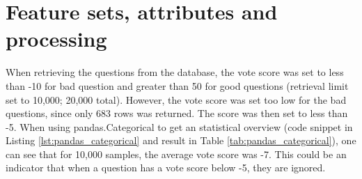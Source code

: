 \begin{comment}
		11. Stemming of data, model creation and gridsearch with SGD			
		12. Model based on 20,000 samples (10k good, 10k bad) - took approx ~3hours for both models
			Model 1 was for all data (no test set). Model 2 was based on train\_test\_split
		13. Added tags column to the used dataset. Added the unprocessed dataset (but html is removed)
		14. Tested out different SVM algorithms (SVC, SGD and LinearSVC)
			Issue was that I managed to overwrite the .csv, so I had to do everything over again
			took approximately 24-36 hours to complete (+ 3days before hand to make everything run smoothly).
		15. Attempted to use optparse, argparse to make it executable. 
			Problem is that it exits after command is run. Need it to continue running to be able to:
				a) create new (or load existing) model
				b) use model from a) to predict quality of entered question (rinse/repeat)
		16. Used while loop instead (loop until exit entered). shortcuts are the same as with argparse, but 
			without the '-' in front (e.g. instead of -e, just press 'e' to exit)
			
		Additional Notes (which might be relevant for the next section):
		
			- issues with setting up environment, installations, etc
			- switching from "good"/"bad" to +/-1 for class label (bcz libsvm)
			- switching from -10/+50 to -5/+50 to get more separation (and more results for bad)
			
		Potentially useful links:
		
		http://billchambers.me/tutorials/2015/01/14/python-nlp-cheatsheet-nltk-scikit-learn.html
		http://stackoverflow.com/questions/28064634/random-state-pseudo-random-numberin-scikit-learn
		http://stackoverflow.com/questions/35382657/my-pipeline-configuration-for-text-classification-using-
		sklearn-in-python
\end{comment}

\section{Feature sets, attributes and processing}
\label{sec:feature_sets}
When retrieving the questions from the database, the vote score was set to less than -10 for bad question and greater than 50 for good questions (retrieval limit set to 10,000; 20,000 total). 
However, the vote score was set too low for the bad questions, since only 683 rows was returned. 
The score was then set to less than -5. 
When using pandas.Categorical to get an statistical overview (code snippet in Listing \ref{lst:pandas_categorical} and result in Table \ref{tab:pandas_categorical}), 
one can see that for 10,000 samples, the average vote score was -7. This could be an indicator that when a question has a vote score below -5, they are ignored.

